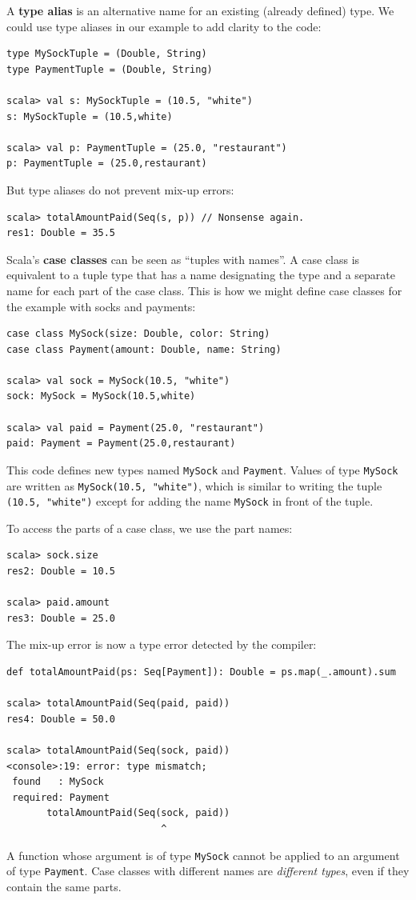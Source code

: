 A \textbf{type alias} is an alternative name for
an existing (already defined) type. We could use type aliases in our
example to add clarity to the code:
\begin{lstlisting}
type MySockTuple = (Double, String)
type PaymentTuple = (Double, String)

scala> val s: MySockTuple = (10.5, "white")
s: MySockTuple = (10.5,white)

scala> val p: PaymentTuple = (25.0, "restaurant")
p: PaymentTuple = (25.0,restaurant)
\end{lstlisting}
But type aliases do not prevent mix-up errors:
\begin{lstlisting}
scala> totalAmountPaid(Seq(s, p)) // Nonsense again.
res1: Double = 35.5
\end{lstlisting}

Scala\textsf{'}s \textbf{case classes} can be seen as \textsf{``}tuples
with names\textsf{''}. A case class is equivalent to a tuple type that has
a name designating the type and a separate name for each part of the
case class. This is how we might define case classes for the example
with socks and payments:
\begin{lstlisting}
case class MySock(size: Double, color: String)
case class Payment(amount: Double, name: String)

scala> val sock = MySock(10.5, "white")
sock: MySock = MySock(10.5,white)

scala> val paid = Payment(25.0, "restaurant")
paid: Payment = Payment(25.0,restaurant)                                  
\end{lstlisting}
This code defines new types named \lstinline!MySock! and \lstinline!Payment!.
Values of type \lstinline!MySock! are written as \lstinline!MySock(10.5, "white")!,
which is similar to writing the tuple \lstinline!(10.5, "white")!
except for adding the name \lstinline!MySock! in front of the tuple.

To access the parts of a case class, we use the part names:
\begin{lstlisting}
scala> sock.size
res2: Double = 10.5

scala> paid.amount
res3: Double = 25.0
\end{lstlisting}
The mix-up error is now a type error detected by
the compiler:
\begin{lstlisting}
def totalAmountPaid(ps: Seq[Payment]): Double = ps.map(_.amount).sum

scala> totalAmountPaid(Seq(paid, paid))
res4: Double = 50.0

scala> totalAmountPaid(Seq(sock, paid))
<console>:19: error: type mismatch;
 found   : MySock
 required: Payment
       totalAmountPaid(Seq(sock, paid))
                           ^
\end{lstlisting}
A function whose argument is of type \lstinline!MySock! cannot be
applied to an argument of type \lstinline!Payment!. Case classes
with different names are \emph{different types}, even if they contain
the same parts. 

